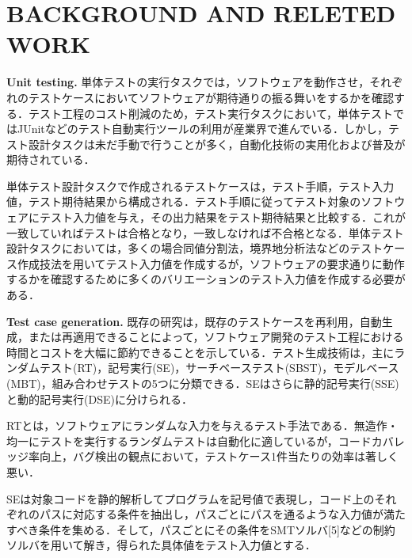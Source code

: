 \documentclass[conference]{IEEEtran}
\begin{document}

\section{BACKGROUND AND RELETED WORK}
\textbf{Unit testing. }単体テストの実行タスクでは，ソフトウェアを動作させ，それぞれのテストケースにおいてソフトウェアが期待通りの振る舞いをするかを確認する．テスト工程のコスト削減のため，テスト実行タスクにおいて，単体テストではJUnitなどのテスト自動実行ツールの利用が産業界で進んでいる．しかし，テスト設計タスクは未だ手動で行うことが多く，自動化技術の実用化および普及が期待されている．

単体テスト設計タスクで作成されるテストケースは，テスト手順，テスト入力値，テスト期待結果から構成される．テスト手順に従ってテスト対象のソフトウェアにテスト入力値を与え，その出力結果をテスト期待結果と比較する．これが一致していればテストは合格となり，一致しなければ不合格となる．単体テスト設計タスクにおいては，多くの場合同値分割法，境界地分析法などのテストケース作成技法を用いてテスト入力値を作成するが，ソフトウェアの要求通りに動作するかを確認するために多くのバリエーションのテスト入力値を作成する必要がある．

\textbf{Test case generation. }既存の研究\cite{b12}は，既存のテストケースを再利用，自動生成，または再適用できることによって，ソフトウェア開発のテスト工程における時間とコストを大幅に節約できることを示している．テスト生成技術は，主にランダムテスト(RT)，記号実行(SE)，サーチベーステスト(SBST)，モデルベース(MBT)，組み合わせテストの5つに分類できる．SEはさらに静的記号実行(SSE)と動的記号実行(DSE)に分けられる．

RTとは，ソフトウェアにランダムな入力を与えるテスト手法である．無造作・均一にテストを実行するランダムテストは自動化に適しているが，コードカバレッジ率向上，バグ検出の観点において，テストケース1件当たりの効率は著しく悪い．

SEは対象コードを静的解析してプログラムを記号値で表現し，コード上のそれぞれのパスに対応する条件を抽出し，パスごとにパスを通るような入力値が満たすべき条件を集める．そして，パスごとにその条件をSMTソルバ[5]などの制約ソルバを用いて解き，得られた具体値をテスト入力値とする．
\end{document}
